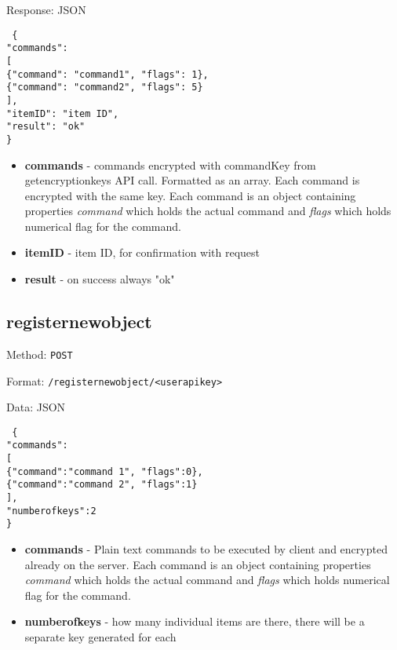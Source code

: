 Response: JSON

\texttt{
  \{ \\
  "commands": \\
  {[ \\
    \{"command": "command1", "flags": 1\}, \\
    \{"command": "command2", "flags": 5\}\\
  ]}, \\
  "itemID": "item ID", \\
  "result": "ok"\\
  \}
}

\begin{itemize}
  \item \textbf{commands} - commands encrypted with commandKey from getencryptionkeys API call. Formatted as an array. Each command is encrypted with the same key. Each command is an object containing properties \emph{command} which holds the actual command and \emph{flags} which holds numerical flag for the command.
  \item \textbf{itemID} - item ID, for confirmation with request
  \item \textbf{result} - on success always "ok"
\end{itemize}

\subsection{registernewobject}
Method: \texttt{POST}

Format: \texttt{/registernewobject/<userapikey>}

Data: JSON

\texttt{
  \{\\
  "commands":\\
  {[\\
  \{"command":"command 1", "flags":0\},\\
  \{"command":"command 2", "flags":1\}\\
  ]},\\
  "numberofkeys":2\\
  \}
}

\begin{itemize}
  \item \textbf{commands} - Plain text commands to be executed by client and encrypted already on the server. Each command is an object containing properties \emph{command} which holds the actual command and \emph{flags} which holds numerical flag for the command.
  \item \textbf{numberofkeys} - how many individual items are there, there will be a separate key generated for each
\end{itemize}

